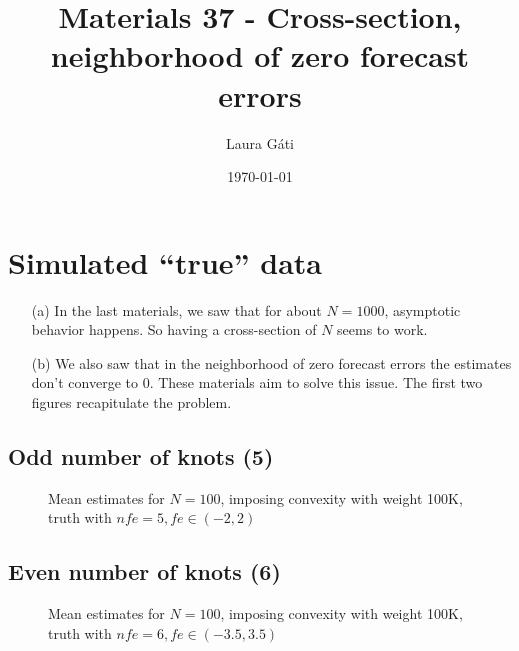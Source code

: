 \documentclass[11pt]{article}
\def \myFigPath {../../figures/}
\renewcommand{\[}{\begin{equation}}
\renewcommand{\]}{\end{equation}}
\def\mySmallerFigScale{0.18}
\def\myTinyFigScale{0.16}
\begin{document}
\linespread{1.0}

\title{Materials 37 - Cross-section, neighborhood of zero forecast errors}
\author{Laura G\'ati} 
\date{\today}
\maketitle


\tableofcontents


\newpage

\section{Simulated ``true'' data}
\begin{itemize}
\item[(a)] In the last materials, we saw that for about $N=1000$, asymptotic behavior happens. So having a cross-section of $N$ seems to work.
\item[(b)] We also saw that in the neighborhood of zero forecast errors the estimates don't converge to 0. These materials aim to solve this issue. The first two figures recapitulate the problem.
\end{itemize}

\subsection{Odd number of knots (5)}

\begin{figure}[h!]
\hfill
{}
\caption{Mean estimates for $N=100$, imposing convexity with weight 100K, truth with $nfe=5, fe \in(-2,2)$}
\end{figure}

\subsection{Even number of knots (6)}

\begin{figure}[h!]
\hfill
{}
\caption{Mean estimates for $N=100$, imposing convexity with weight 100K, truth with $nfe=6, fe \in(-3.5,3.5)$ }
\end{figure}
\end{document}
